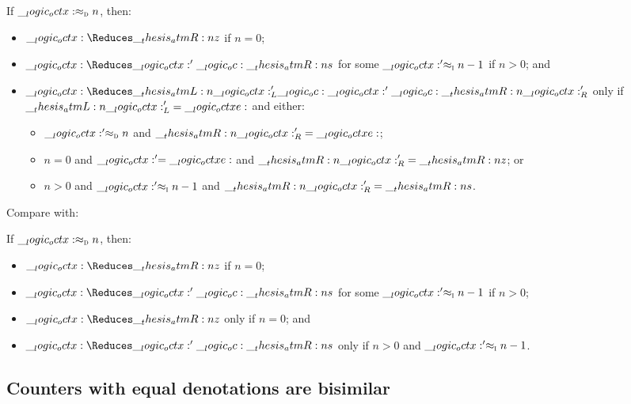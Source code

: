 \begin{theorem}\label{thm:msg-dec-big-adequacy}
  If $\__logic_octx: \approx\sb{\text{\normalfont\scshape d}} n$, then:
  \begin{itemize}[nosep]
  \item $\octx \Reduces \atmR{z}$ if $n = 0$;
  \item $\octx \Reduces \octx' \oc \atmR{s}$ for some $\__logic_octx:' \approx\sb{\text{\normalfont\scshape i}} n-1$ if $n > 0$; and
  \item $\octx \Reduces \atmL{\octx}'_L \oc \octx' \oc \atmR{\octx}'_R$ only if $\__thesis_atmL:n {\__logic_octx:}'_L = \__logic_octxe:$ and either:
    \begin{itemize}[nosep]
    \item $\__logic_octx:' \approx\sb{\text{\normalfont\scshape d}} n$ and $\__thesis_atmR:n {\__logic_octx:}'_R = \__logic_octxe:$;
    \item $n = 0$ and $\__logic_octx:' = \__logic_octxe:$ and $\__thesis_atmR:n {\__logic_octx:}'_R = \__thesis_atmR:n {z}$; or
    \item $n > 0$ and $\__logic_octx:' \approx\sb{\text{\normalfont\scshape i}} n-1$ and $\__thesis_atmR:n {\__logic_octx:}'_R = \__thesis_atmR:n {s}$.
    \end{itemize}
  \end{itemize}
\end{theorem}

Compare with:
\begin{theorem}
  If $\__logic_octx: \approx\sb{\text{\normalfont\scshape d}} n$, then:
  \begin{itemize}[nosep]
  \item $\octx \Reduces \atmR{z}$ if $n = 0$;
  \item $\octx \Reduces \octx' \oc \atmR{s}$ for some $\__logic_octx:' \approx\sb{\text{\normalfont\scshape i}} n-1$ if $n > 0$;
  \item $\octx \Reduces \atmR{z}$ only if $n = 0$; and
  \item $\octx \Reduces \octx' \oc \atmR{s}$ only if $n > 0$ and $\__logic_octx:' \approx\sb{\text{\normalfont\scshape i}} n-1$.
  \end{itemize}
\end{theorem}

\subsection{Counters with equal denotations are bisimilar}

